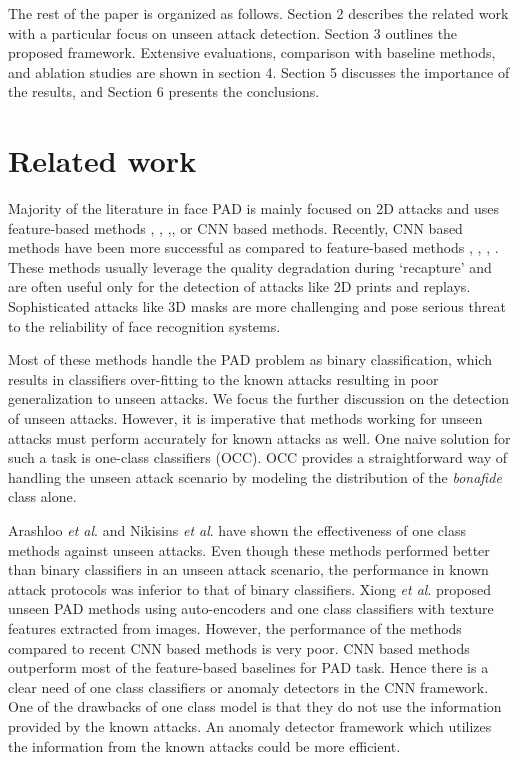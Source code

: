 \documentclass[journal]{IEEEtran}
\begin{document}
The rest of the paper is organized as follows. Section 2 describes the related work with a particular focus on unseen attack detection. Section 3 outlines the proposed framework. Extensive evaluations, comparison with baseline methods, and ablation studies are shown in section 4. Section 5 discusses the importance of the results, and Section 6 presents the conclusions.

\section{Related work}

Majority of the literature in face PAD is mainly focused on 2D attacks and uses feature-based methods \cite{boulkenafet2015face}, \cite{maatta2011face},  \cite{anjos2011counter},\cite{ramachandra2017presentation}, \cite{heusch2019remote} or CNN based methods. Recently, CNN based methods have been more successful as compared to feature-based methods \cite{liu2018learning}, \cite{george2019deep}, \cite{atoum2017face}, \cite{shao2017deep}. These methods usually leverage the quality degradation during `recapture' and are often useful only for the detection of attacks like 2D prints and replays. Sophisticated attacks like 3D masks are more challenging and pose serious threat to the reliability of face recognition systems.

Most of these methods handle the PAD problem as binary classification, which results in classifiers over-fitting to the known attacks resulting in poor generalization to unseen attacks. We focus the further discussion on the detection of unseen attacks. However, it is imperative that methods working for unseen attacks must perform accurately for known attacks as well. One naive solution for such a task is one-class classifiers (OCC). OCC provides a straightforward way of handling the unseen attack scenario by modeling the distribution of the \textit{bonafide} class alone.

Arashloo \textit{et al}.\cite{arashloo2017anomaly} and Nikisins \textit{et al}. \cite{nikisins2018effectiveness} have shown the effectiveness of one class methods against unseen attacks. Even though these methods performed better than binary classifiers in an unseen attack scenario, the performance in known attack protocols was inferior to that of binary classifiers. Xiong \textit{et al}. \cite{xiong2018unknown} proposed unseen PAD methods using auto-encoders and one class classifiers with texture features extracted from images.  However, the performance of the methods compared to recent CNN based methods is very poor. CNN based methods outperform most of the feature-based baselines for PAD task. Hence there is a clear need of one class classifiers or anomaly detectors in the CNN framework. One of the drawbacks of one class model is that they do not use the information provided by the known attacks. An anomaly detector framework which utilizes the information from the known attacks could be more efficient.
\end{document}
